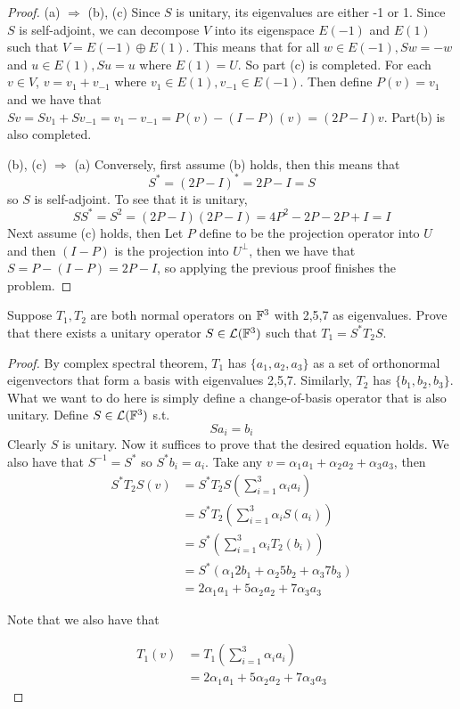 \documentclass{extarticle}
\begin{document}
\begin{proof}
(a) \(\Rightarrow\) (b), (c) Since \(S\) is unitary, its eigenvalues are either -1 or 1. Since 
\(S\) is self-adjoint, we can decompose \(V\) into its eigenspace \(E(-1)\) and 
\(E(1)\) such that \(V = E(-1) \oplus E(1)\). This means that for all \(w \in E(-1), 
Sw = - w\) and \(u \in E(1), S u = u\) where \(E(1) = U\). So part (c) is completed. For 
each \(v \in V\), \(v = v_1 + v_{-1}\) where \(v_1 \in E(1), v_{-1} \in E(-1)\). Then define 
\(P(v) = v_1\) and we have that \(Sv = Sv_1 + S v_{-1} = v_1 - v_{-1} = P(v) - (I - P)(v) 
= (2P - I) v\). Part(b) is also completed. 

(b), (c) \(\Rightarrow\) (a) Conversely, first assume (b) holds, then this means that 
\[S^* = (2P - I)^* = 2P - I = S\]
so \(S\) is self-adjoint. To see that it is unitary, 
\[SS^* = S^2 = (2P - I)(2P - I) = 4P^2 - 2P - 2P + I = I\]
Next assume (c) holds, then Let \(P\) define to be the projection operator into \(U\) and then 
\((I - P)\) is the projection into \(U^\perp\), then we have that \(S = P - (I - P) = 2P - I\), so 
applying the previous proof finishes the problem. 
\end{proof}


\begin{problem}{6}
    Suppose \(T_1, T_2\) are both normal operators on \(\mathbb{F}^3\) with 2,5,7 as eigenvalues. Prove 
    that there exists a unitary operator \(S \in \mathcal{L}(\mathbb{F}^3)\) such that \(T_1 = S^* T_2 S\).
\end{problem}

\begin{proof}
By complex spectral theorem, \(T_1\) has \(\{a_1, a_2, a_3\}\) as a set of orthonormal eigenvectors that 
form a basis with eigenvalues 2,5,7. Similarly, \(T_2\) has \(\{b_1, b_2, b_3\}\). What we want to 
do here is simply define a change-of-basis operator that is also unitary. Define \(S \in \mathcal{L}(\mathbb{F}^3)\) s.t. 
\[S a_i = b_i\] 
Clearly \(S\) is unitary. Now it suffices to prove that the desired equation holds. 
We also have that \(S^{-1} = S^* \) so \(S^* b_i = a_i\). Take any 
\(v = \alpha_1 a_1 + \alpha_2 a_2 + \alpha_3 a_3\), then 
\begin{align*}
    S^*T_2S (v) 
    &= S^*T_2S(\sum_{i=1}^{3} \alpha_i a_i) \\ 
    &= S^*T_2( \sum_{i=1}^{3} \alpha_i S(a_i) ) \\ 
    &= S^* (\sum_{i=1}^{3} \alpha_i T_2(b_i)) \\ 
    &= S^*( \alpha_1 2b_1 + \alpha_2 5b_2 + \alpha_3 7b_3) \\ 
    &= 2 \alpha_1 a_1 + 5 \alpha_2 a_2 + 7 \alpha_3 a_3 
\end{align*}

Note that we also have that 

\begin{align*}
    T_1 (v) 
    &= T_1 (\sum_{i=1}^{3} \alpha_i a_i) \\ 
    &= 2\alpha_1 a_1 + 5 \alpha_2 a_2 + 7 \alpha_3 a_3
\end{align*}
\end{proof}
\end{document}
